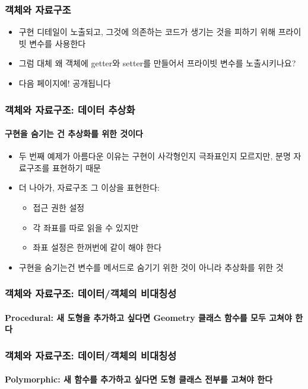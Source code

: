 \documentclass{beamer}
\begin{document}
\begin{frame}
    \frametitle{객체와 자료구조}
    \begin{itemize}
        \item 구현 디테일이 노출되고, 그것에 의존하는 코드가 생기는 것을 피하기 위해  프라이빗 변수를 사용한다
        \item 그럼 대체 왜 객체에 getter와 setter를 만들어서 프라이빗 변수를 노출시키나요?
        \item 다음 페이지에! 공개됩니다
    \end{itemize}
\end{frame}

\begin{frame}
    \frametitle{객체와 자료구조: 데이터 추상화}
    \framesubtitle{구현을 숨기는 건 추상화를 위한 것이다}
    
    
    \begin{itemize}
        \item 두 번째 예제가 아름다운 이유는 구현이 사각형인지 극좌표인지 모르지만, 분명 자료구조를 표현하기 때문
        \item 더 나아가, 자료구조 그 이상을 표현한다:
            \begin{itemize}
                \item 접근 권한 설정
                \item 각 좌표를 따로 읽을 수 있지만
                \item 좌표 설정은 한꺼번에 같이 해야 한다
            \end{itemize}
        \item 구현을 숨기는건 변수를 메서드로 숨기기 위한 것이 아니라 추상화를 위한 것
    \end{itemize}
\end{frame}

\begin{frame}
    \frametitle{객체와 자료구조: 데이터/객체의 비대칭성}
    \framesubtitle{Procedural: 새 도형을 추가하고 싶다면 Geometry 클래스 함수를 모두 고쳐야 한다}
    
\end{frame}

\begin{frame}
    \frametitle{객체와 자료구조: 데이터/객체의 비대칭성}
    \framesubtitle{Polymorphic: 새 함수를 추가하고 싶다면 도형 클래스 전부를 고쳐야 한다}
    
\end{frame}
\end{document}
